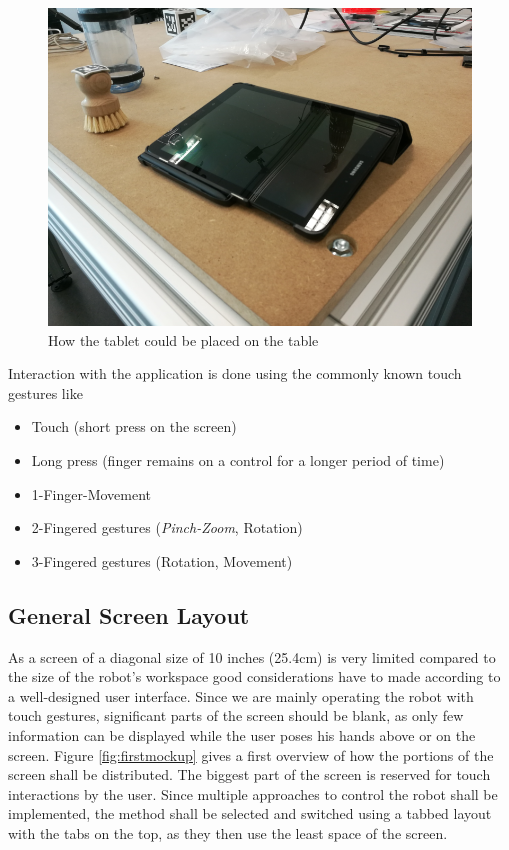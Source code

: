 \begin{figure}
	\caption{\label{fig:ui:tablet}How the tablet could be placed on the table}
	\includegraphics[width=\linewidth]{assets/chpt_concepts/tablet.png}
\end{figure}

Interaction with the application is done using the commonly known touch gestures like
\begin{itemize}
	\item Touch (short press on the screen)
	\item Long press (finger remains on a control for a longer period of time)
	\item 1-Finger-Movement
	\item 2-Fingered gestures (\textit{Pinch-Zoom}, Rotation)
	\item 3-Fingered gestures (Rotation, Movement)
\end{itemize}

\subsection{General Screen Layout}

As a screen of a diagonal size of 10 inches (25.4cm) is very limited compared to the size of the robot's workspace good considerations have to made according to a well-designed user interface. Since we are mainly operating the robot with touch gestures, significant parts of the screen should be blank, as only few information can be displayed while the user poses his hands above or on the screen. Figure \ref{fig:firstmockup} gives a first overview of how the portions of the screen shall be distributed. The biggest part of the screen is reserved for touch interactions by the user. Since multiple approaches to control the robot shall be implemented, the method shall be selected and switched using a tabbed layout with the tabs on the top, as they then use the least space of the screen.

